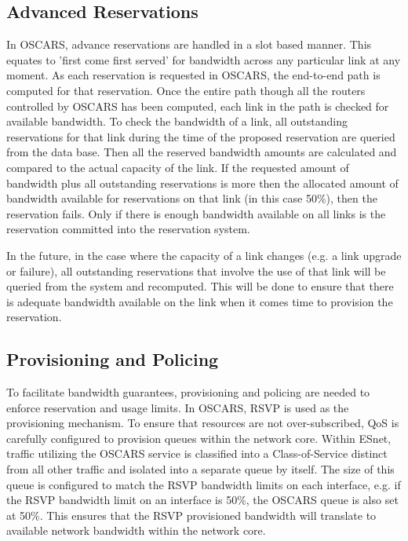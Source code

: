 \documentclass[conference]{IEEEtran}
\begin{document}
\subsection{Advanced Reservations }
In OSCARS, advance reservations are handled in a slot based manner. This equates
to 'first come first served' for bandwidth across any particular link at any
moment. As each reservation is requested in OSCARS, the end-to-end path is
computed for that reservation. Once the entire path though all the routers
controlled by OSCARS has been computed, each link in the path is checked for
available bandwidth. To check the bandwidth of a link, all outstanding
reservations for that link during the time of the proposed reservation are
queried from the data base. Then all the reserved bandwidth amounts are
calculated and compared to the actual capacity of the link. If the requested
amount of bandwidth plus all outstanding reservations is more then the allocated
amount of bandwidth available for reservations on that link (in this case
50\%), then the reservation fails. Only if there is enough bandwidth 
available on all links is the reservation committed into the reservation system.

In the future, in the case where the capacity of a link changes (e.g. a link 
upgrade or failure), all outstanding reservations
that involve the use of that link will be queried from the system and 
recomputed.
This will be done to ensure that there is adequate bandwidth available on the
link when it comes time to provision the reservation.

\subsection{Provisioning and Policing}
To facilitate bandwidth guarantees, provisioning and policing are needed to 
enforce reservation and usage limits.  In OSCARS, RSVP is used as the 
provisioning mechanism.  To ensure that resources are not over-subscribed, QoS 
is carefully configured to provision queues within the network core.  Within 
ESnet, traffic utilizing the OSCARS service is classified into a 
Class-of-Service distinct from all other traffic and isolated into a separate 
queue by 
itself.  The size of this queue is configured to match the RSVP bandwidth 
limits on each interface, e.g. if the RSVP bandwidth limit on an interface is 
50\%, the OSCARS queue is also set at 50\%.  This ensures that the RSVP 
provisioned bandwidth will translate to available network bandwidth within 
the network core.
\end{document}

